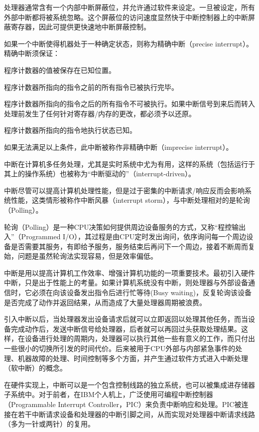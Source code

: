 处理器通常含有一个内部中断屏蔽位，并允许通过软件来设定。一旦被设定，所有外部中断都将被系统忽略。这个屏蔽位的访问速度显然快于中断控制器上的中断屏蔽寄存器，因此可提供更快速地中断屏蔽控制。

如果一个中断使得机器处于一种确定状态，则称为精确中断（precise interrupt）。精确中断须保证：

\begin{compactitem}
\item 程序计数器的值被保存在已知位置。
\item 程序计数器所指向的指令之前的所有指令已被执行完毕。
\item 程序计数器所指向的指令之后的所有指令不可被执行。如果中断信号到来后而转入处理前发生了任何针对寄存器/内存的更改，都必须予以还原。
\item 程序计数器所指向的指令地执行状态已知。
\end{compactitem}


如果无法满足以上条件，此中断被称作非精确中断（imprecise interrupt）。

中断在计算机多任务处理，尤其是实时系统中尤为有用，这样的系统（包括运行于其上的操作系统）也被称为“中断驱动的”（interrupt-driven）。


中断尽管可以提高计算机处理性能，但是过于密集的中断请求/响应反而会影响系统性能，这类情形被称作中断风暴（interrupt storm），与中断处理相对的是轮询（Polling）。

轮询（Polling）是一种CPU决策如何提供周边设备服务的方式，又称“程控输出入”（Programmed I/O），其过程是由CPU定时发出询问，依序询问每一个周边设备是否需要其服务，有即给予服务，服务结束后再问下一个周边，接着不断周而复始，问题是虽然轮询法实现容易，但是效率偏低。

中断是用以提高计算机工作效率、增强计算机功能的一项重要技术。最初引入硬件中断，只是出于性能上的考量。如果计算机系统没有中断，则处理器与外部设备通信时，它必须在向该设备发出指令后进行忙等待(Busy waiting)，反复轮询该设备是否完成了动作并返回结果，从而造成了大量处理器周期被浪费。

引入中断以后，当处理器发出设备请求后就可以立即返回以处理其他任务，而当设备完成动作后，发送中断信号给处理器，后者就可以再回过头获取处理结果。这样，在设备进行处理的周期内，处理器可以执行其他一些有意义的工作，而只付出一些很小的切换所引发的时间代价。后来被用于CPU外部与内部紧急事件的处理、机器故障的处理、时间控制等多个方面，并产生通过软件方式进入中断处理（软中断）的概念。

在硬件实现上，中断可以是一个包含控制线路的独立系统，也可以被集成进存储器子系统中。对于前者，在IBM个人机上，广泛使用可编程中断控制器（Programmable Interrupt Controller，PIC）来负责中断响应和处理。PIC被连接在若干中断请求设备和处理器的中断引脚之间，从而实现对处理器中断请求线路（多为一针或两针）的复用。

